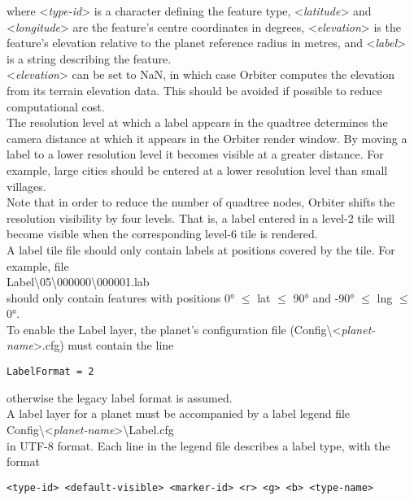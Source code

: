 \documentclass[Orbiter Developer Manual.tex]{subfiles}
\begin{document}
\noindent
where <\textit{type-id}> is a character defining the feature type, <\textit{latitude}> and <\textit{longitude}> are the feature's centre coordinates in degrees, <\textit{elevation}> is the feature's elevation relative to the planet reference radius in metres, and <\textit{label}> is a string describing the feature.\\
<\textit{elevation}> can be set to NaN, in which case Orbiter computes the elevation from its terrain elevation data. This should be avoided if possible to reduce computational cost.\\
The resolution level at which a label appears in the quadtree determines the camera distance at which it appears in the Orbiter render window. By moving a label to a lower resolution level it becomes visible at a greater distance. For example, large cities should be entered at a lower resolution level than small villages.\\
Note that in order to reduce the number of quadtree nodes, Orbiter shifts the resolution visibility by four levels. That is, a label entered in a level-2 tile will become visible when the corresponding level-6 tile is rendered.\\
A label tile file should only contain labels at positions covered by the tile. For example, file\\
\indent Label\textbackslash 05\textbackslash 000000\textbackslash 000001.lab\\
should only contain features with positions 0° $\leq$ lat $\leq$ 90° and -90° $\leq$ lng $\leq$ 0°.\\
To enable the Label layer, the planet's configuration file (Config\textbackslash <\textit{planet-name}>.cfg) must contain the line

\begin{lstlisting}[language=OSFS]
LabelFormat = 2
\end{lstlisting}

\noindent
otherwise the legacy label format is assumed.\\
A label layer for a planet must be accompanied by a label legend file\\
\indent Config\textbackslash <\textit{planet-name}>\textbackslash Label.cfg\\
in UTF-8 format. Each line in the legend file describes a label type, with the format

\begin{lstlisting}[language=OSFS]
<type-id> <default-visible> <marker-id> <r> <g> <b> <type-name>
\end{lstlisting}
\end{document}
